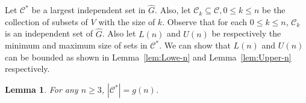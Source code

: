 \documentclass[11pt,letterpaper]{article}
\newtheorem{lemma}{Lemma}
\begin{document}
Let $\mathcal{C}^*$ be a largest independent set in $\widehat{G}$.
Also, let $ \mathcal{C}_k\subseteq \mathcal{C} , 0 \le k \le n$ be the collection
of subsets of $V$ with the size of $k$. Observe that for each $0 \le k \le n$,
$\mathcal{C}_k$ is an independent set of $\widehat{G}$.
Also let $L(n)$ and $U(n)$ be respectively the minimum and maximum size of sets in $\mathcal{C}^*$.
We can show that $L(n)$ and $U(n)$ can be bounded as shown in Lemma~\ref{lem:Lowe-n} and Lemma~\ref{lem:Upper-n} respectively. 


\begin{lemma}\label{lem:maxiindep}
For any $n \ge 3$, $\left | \mathcal{C}^* \right | = g(n)$.
\end{lemma}
\end{document}
